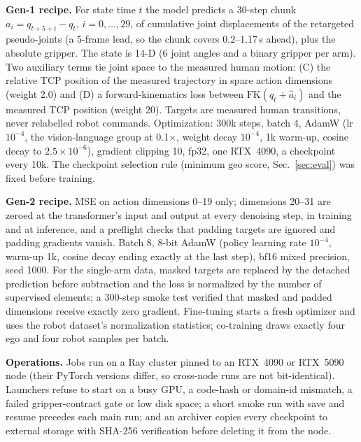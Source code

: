 \documentclass[conference,10pt]{IEEEtran}
\begin{document}
\textbf{Gen-1 recipe.} For state time $t$ the model predicts a 30-step chunk $a_i = q_{t+5+i}-q_t$, $i=0,\dots,29$, of cumulative
joint displacements of the retargeted pseudo-joints (a 5-frame lead, so the chunk covers 0.2--1.17\,s ahead), plus the absolute
gripper. The state is 14-D (6 joint angles and a binary gripper per arm). Two auxiliary terms tie joint space to the measured human
motion: (C) the relative TCP position of the measured trajectory in spare action dimensions (weight 2.0) and (D) a forward-kinematics
loss between $\mathrm{FK}(q_t+\hat a_i)$ and the measured TCP position (weight 20). Targets are measured human transitions, never
relabelled robot commands. Optimization: 300k steps, batch 4, AdamW (lr $10^{-4}$, the vision-language group at 0.1$\times$, weight
decay $10^{-4}$, 1k warm-up, cosine decay to $2.5\times10^{-6}$), gradient clipping 10, fp32, one RTX~4090, a checkpoint every 10k.
The checkpoint selection rule (minimum geo score, Sec.~\ref{sec:eval}) was fixed before training.

\textbf{Gen-2 recipe.} MSE on action dimensions 0--19 only; dimensions 20--31 are zeroed at the transformer's input and output at
every denoising step, in training and at inference, and a preflight checks that padding targets are ignored and padding gradients
vanish. Batch 8, 8-bit AdamW (policy learning rate $10^{-4}$, warm-up 1k, cosine decay ending exactly at the last step), bf16 mixed
precision, seed 1000. For the single-arm data, masked targets are replaced by the detached prediction before subtraction and the loss
is normalized by the number of supervised elements; a 300-step smoke test verified that masked and padded dimensions receive exactly
zero gradient. Fine-tuning starts a fresh optimizer and uses the robot dataset's normalization statistics; co-training draws exactly
four ego and four robot samples per batch.

\textbf{Operations.} Jobs run on a Ray cluster pinned to an RTX~4090 or RTX~5090 node (their PyTorch versions differ, so cross-node
runs are not bit-identical). Launchers refuse to start on a busy GPU, a code-hash or domain-id mismatch, a failed gripper-contract
gate or low disk space; a short smoke run with save and resume precedes each main run; and an archiver copies every checkpoint to
external storage with SHA-256 verification before deleting it from the node.
\end{document}
